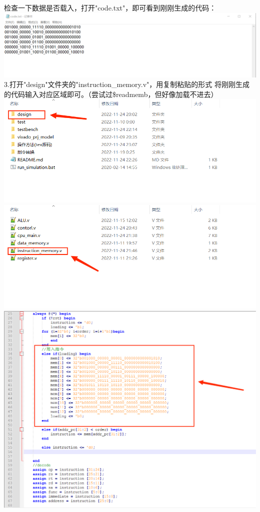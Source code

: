 \documentclass{article}
\newcommand{\tab}{\makebox[2em][l]{}}   %
\begin{document}
\begin{flushleft}
   \tab 检查一下数据是否载入，打开"code.txt"，即可看到刚刚生成的代码：\\
   \mbox{} \hfill{\includegraphics[scale=0.4]{5.png}}\hfill \mbox{}\\
   \tab 3.打开"design"文件夹的"instruction\_memory.v"，用复制粘贴的形式
   将刚刚生成的代码输入对应区域即可。（尝试过\$readmemb，但好像加载不进去）\\
   \mbox{} \hfill{\includegraphics[scale=0.4]{6.png}}\hfill \mbox{}\\
   \mbox{} \hfill{\includegraphics[scale=0.4]{7.png}}\hfill \mbox{}\\
   \mbox{} \hfill{\includegraphics[scale=0.3]{8.png}}\hfill \mbox{}\\

\end{flushleft}
\end{document}
